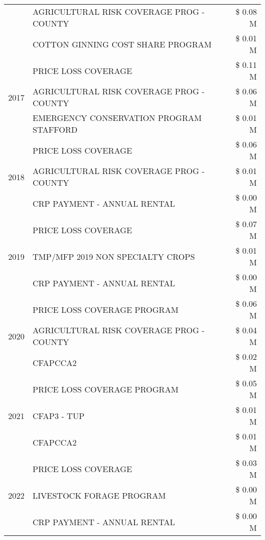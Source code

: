 \begin{tabular}{llr}
 & AGRICULTURAL RISK COVERAGE PROG - COUNTY & \$ 0.08 M \\
 & COTTON GINNING COST SHARE PROGRAM & \$ 0.01 M \\
\cline{1-3}
\multirow[t]{3}{*}{2017} & PRICE LOSS COVERAGE & \$ 0.11 M \\
 & AGRICULTURAL RISK COVERAGE PROG - COUNTY & \$ 0.06 M \\
 & EMERGENCY CONSERVATION PROGRAM STAFFORD & \$ 0.01 M \\
\cline{1-3}
\multirow[t]{3}{*}{2018} & PRICE LOSS COVERAGE & \$ 0.06 M \\
 & AGRICULTURAL RISK COVERAGE PROG - COUNTY & \$ 0.01 M \\
 & CRP PAYMENT - ANNUAL RENTAL & \$ 0.00 M \\
\cline{1-3}
\multirow[t]{3}{*}{2019} & PRICE LOSS COVERAGE & \$ 0.07 M \\
 & TMP/MFP 2019 NON SPECIALTY CROPS & \$ 0.01 M \\
 & CRP PAYMENT - ANNUAL RENTAL & \$ 0.00 M \\
\cline{1-3}
\multirow[t]{3}{*}{2020} & PRICE LOSS COVERAGE PROGRAM & \$ 0.06 M \\
 & AGRICULTURAL RISK COVERAGE PROG - COUNTY & \$ 0.04 M \\
 & CFAPCCA2 & \$ 0.02 M \\
\cline{1-3}
\multirow[t]{3}{*}{2021} & PRICE LOSS COVERAGE PROGRAM & \$ 0.05 M \\
 & CFAP3 - TUP & \$ 0.01 M \\
 & CFAPCCA2 & \$ 0.01 M \\
\cline{1-3}
\multirow[t]{3}{*}{2022} & PRICE LOSS COVERAGE & \$ 0.03 M \\
 & LIVESTOCK FORAGE PROGRAM & \$ 0.00 M \\
 & CRP PAYMENT - ANNUAL RENTAL & \$ 0.00 M \\
\cline{1-3}
\bottomrule
\end{tabular}
